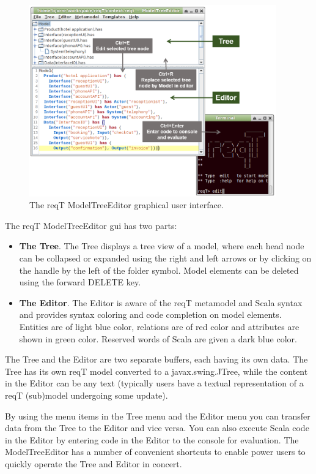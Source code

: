 \documentclass[11pt]{article}
\begin{document}
\begin{figure}[h]
    \centering
    \includegraphics[width=0.95\textwidth]{gui.png}
    \caption{The reqT ModelTreeEditor graphical user interface.}
    \label{fig:gui}
\end{figure}

The reqT ModelTreeEditor gui has two parts:
\begin{itemize}
\item {\bf The Tree}. The Tree displays a tree view of a model, where each head node can be collapsed or expanded using the right and left arrows or by clicking on the handle by the left of the folder symbol. Model elements can be deleted using the forward DELETE key.
\item {\bf The Editor}. The Editor is aware of the reqT metamodel and Scala syntax and provides syntax coloring and code completion on model elements. Entities are of light blue color, relations are of red color and attributes are shown in green color. Reserved words of Scala are given a dark blue color.
\end{itemize}

The Tree and the Editor are two separate buffers, each having its own data. The Tree has its own reqT model converted to a javax.swing.JTree, while the content in the Editor can be any text (typically users have a textual representation of a reqT (sub)model undergoing  some update). 

By using the menu items in the Tree menu and the Editor menu you can transfer data from the Tree to the Editor and vice versa. You can also execute Scala code in the Editor by entering code in the Editor to the console for evaluation. The ModelTreeEditor has a number of convenient shortcuts to enable power users to quickly operate the Tree and Editor in concert.
\end{document}
